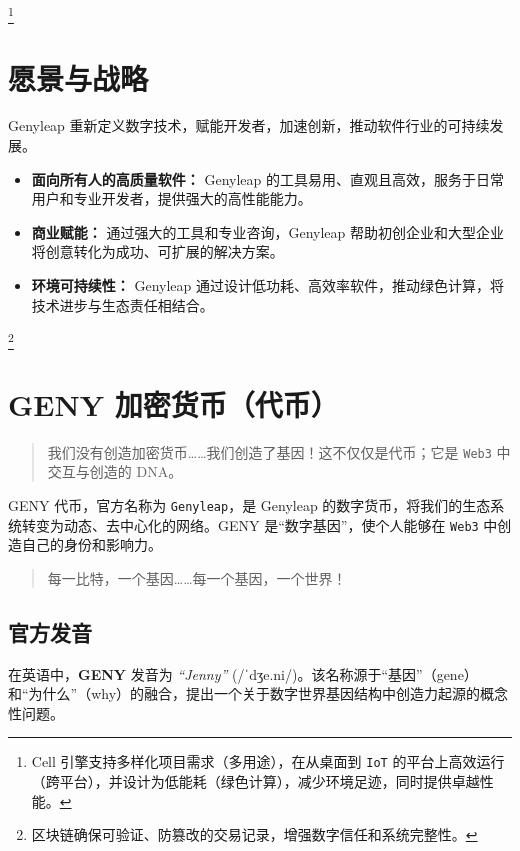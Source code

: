 \documentclass[a4paper,12pt,openany]{book}
\begin{document}
\footnote{Cell 引擎支持多样化项目需求（多用途），在从桌面到 \texttt{IoT} 的平台上高效运行（跨平台），并设计为低能耗（绿色计算），减少环境足迹，同时提供卓越性能。}

\chapter{愿景与战略}

Genyleap 重新定义数字技术，赋能开发者，加速创新，推动软件行业的可持续发展。

\begin{itemize}
    \item \textbf{面向所有人的高质量软件：} Genyleap 的工具易用、直观且高效，服务于日常用户和专业开发者，提供强大的高性能能力。
    \item \textbf{商业赋能：} 通过强大的工具和专业咨询，Genyleap 帮助初创企业和大型企业将创意转化为成功、可扩展的解决方案。
    \item \textbf{环境可持续性：} Genyleap 通过设计低功耗、高效率软件，推动绿色计算，将技术进步与生态责任相结合。
\end{itemize}

\footnote{区块链确保可验证、防篡改的交易记录，增强数字信任和系统完整性。}

\chapter{GENY 加密货币（代币）}
\begin{quote}
我们没有创造加密货币……我们创造了基因！这不仅仅是代币；它是 \texttt{Web3} 中交互与创造的 DNA。
\end{quote}
GENY 代币，官方名称为 \texttt{Genyleap}，是 Genyleap 的数字货币，将我们的生态系统转变为动态、去中心化的网络。GENY 是“数字基因”，使个人能够在 \texttt{Web3} 中创造自己的身份和影响力。
\begin{quote}
每一比特，一个基因……每一个基因，一个世界！
\end{quote}

\section*{官方发音}
在英语中，\textbf{GENY} 发音为 \textit{``Jenny''} ({\ipafont /ˈdʒe.ni/})。该名称源于“基因”（gene）和“为什么”（why）的融合，提出一个关于数字世界基因结构中创造力起源的概念性问题。
\end{document}
